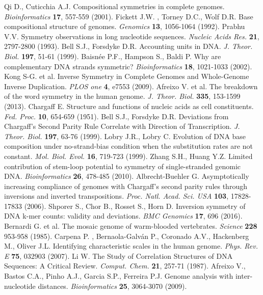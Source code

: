 \documentclass[fleqn,10pt]{wlscirep}
\begin{document}
\begin{thebibliography}{99}
 Qi D.,  Cuticchia A.J.   Compositional symmetries in complete genomes. {\it Bioinformatics} {\bf 17}, 557-559 (2001).
 Fickett J.W. ,  Torney D.C.,  Wolf D.R.  Base compositional structure of genomes. {\it Genomics} {\bf 13}, 1056-1064 (1992).
  Prabhu V.V. Symmetry observations in long nucleotide sequences. {\it Nucleic Acids Res.}  {\bf 21}, 2797-2800 (1993).
  Bell S.J.,   Forsdyke D.R.  Accounting units in DNA. {\it J. Theor. Biol.}  {\bf 197}, 51-61 (1999).
  Baisn\'ee P.F.,  Hampson S.,  Baldi P. Why are complementary DNA strands symmetric? {\it Bioinformatics} {\bf 18}, 1021-1033 (2002).
   Kong S-G. {et al.}  Inverse Symmetry in Complete Genomes and Whole-Genome Inverse Duplication. {\it PLOS one} {\bf 4}, e7553 (2009).
  Afreixo V.  {et al.}  The breakdown of the word symmetry in the human genome. {\it J. Theor. Biol.}  {\bf 335}, 153-1599 (2013).
 Chargaff E. Structure and functions of nucleic acids as cell constituents. {\it Fed. Proc.}  {\bf 10}, 654-659 (1951).
   Bell S.J.,  Forsdyke D.R. Deviations from Chargaff's Second Parity Rule Correlate with Direction of Transcription. {\it J. Theor. Biol.}  {\bf 197},  63-76 (1999).
  Lobry J.R.,  Lobry C.  Evolution of DNA base composition under no-strand-bias condition when the substitution rates are not constant. {\it  Mol. Biol. Evol.}  {\bf 16}, 719-723 (1999).
  Zhang S.H.,  Huang Y.Z.  Limited contribution of stem-loop potential to symmetry of single-stranded genomic DNA. {\it Bioinformatics} {\bf 26}, 478-485 (2010).
  Albrecht-Buehler  G.  Asymptotically increasing compliance of genomes with Chargaff's second parity rules through inversions and inverted transpositions. {\it Proc. Natl. Acad. Sci. USA}  {\bf 103}, 17828-17833 (2006).
 Shporer S., Chor B.,  Rosset S.,  Horn D.  Inversion symmetry of DNA k-mer counts: validity and deviations. {\it BMC Genomics}  {\bf 17}, 696 (2016).
  Bernardi G. {et al.}  The mosaic genome of warm-blooded vertebrates. {\it Science } {\bf 228} 953-958 (1985).
 Carpena P. ,  Bernaola-Galv\'an P.,  Coronado A.V.,  Hackenberg M.,  Oliver J.L. Identifying characteristic scales in the human genome. {\it Phys. Rev. E} {\bf 75},  032903 (2007).
 Li  W. The Study of Correlation Structures of DNA Sequences: A Critical Review. {\it Comput. Chem.} {\bf 21}, 257-71 (1987). 
  Afreixo V.,  Bastos C.A.,  Pinho A.J.,  Garcia S.P.,  Ferreira P.J. Genome analysis with inter-nucleotide distances. {\it Bioinformatics}  {\bf 25},  3064-3070 (2009).

\end{thebibliography}
\end{document}
